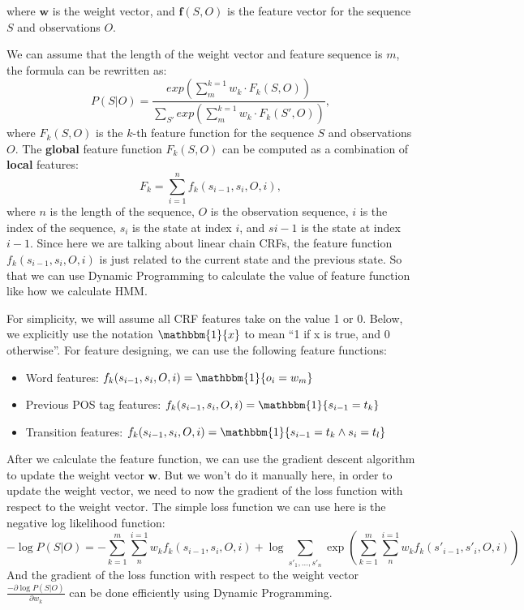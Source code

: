 \documentclass{article}
\begin{document}
where $\mathbf{w}$ is the weight vector, 
and $\mathbf{f}(S, O)$ is the feature vector for the sequence $S$ and observations $O$.

We can assume that the length of the weight vector and feature sequence is $m$, 
the formula can be rewritten as:
$$P(S|O) = \frac{exp( {\textstyle \sum_{m}^{k=1} w_{k} \cdot F_{k}(S, O) })}{ {\textstyle \sum_{S'}^{}exp( {\textstyle \sum_{m}^{k=1} w_{k} \cdot F_{k}(S', O) })} },$$
where $F_{k}(S, O)$ is the $k$-th feature function for the sequence $S$ and observations $O$.
The \textbf{global} feature function $F_{k}(S, O)$ can be computed as a combination of \textbf{local} features:
$$F_{k} =  \sum_{i=1}^{n}f_{k}(s_{i-1}, s_{i}, O, i),$$
where $n$ is the length of the sequence, $O$ is the observation sequence, 
$i$ is the index of the sequence, $s_{i}$ is the state at index $i$, 
and $s{i-1}$ is the state at index $i-1$.
Since here we are talking about linear chain CRFs, 
the feature function $f_{k}(s_{i-1}, s_{i}, O, i)$ is just related to the current state 
and the previous state. So that we can use Dynamic Programming to calculate 
the value of feature function like how we calculate HMM.

For simplicity, we will assume all CRF features take on the value 1 or 0. 
Below, we
explicitly use the notation $\mathbbm{1}\{x\}$ to mean ``1 if x is true, and 0 otherwise''.
For feature designing, we can use the following feature functions:
\begin{itemize}
    \item Word features: $f_{k}(s_{i-1}, s_{i}, O, i) = \mathbbm{1}\{o_{i} = w_{m}\}$
    \item Previous POS tag features: $f_{k}(s_{i-1}, s_{i}, O, i) = \mathbbm{1}\{s_{i-1} = t_{k}\}$
    \item Transition features: $f_{k}(s_{i-1}, s_{i}, O, i) = \mathbbm{1}\{s_{i-1} = t_{k} \land s_{i} = t_{l}\}$
\end{itemize}

After we calculate the feature function, 
we can use the gradient descent algorithm to update the weight vector $\mathbf{w}$.
But we won't do it manually here, in order to update the weight vector,
we need to now the gradient of the loss function with respect to the weight vector.
The simple loss function we can use here is the negative log likelihood function:
$$-\log P(S|O) = -\sum_{k=1}^{m}\sum_{n}^{i=1}w_{k}f_{k}(s_{i-1},s_{i},O,i)+
\log \sum_{s'_{1}, 
\dots,s'_{n} }^{} \exp (\sum_{k=1}^{m}\sum_{n}^{i=1}w_{k}f_{k}(s'_{i-1},s'_{i},O,i))$$
And the gradient of the loss function with respect to the weight vector
$\frac{-\partial \log P(S|O)}{\partial w_{k}} $ can be done efficiently using Dynamic Programming.
\end{document}

